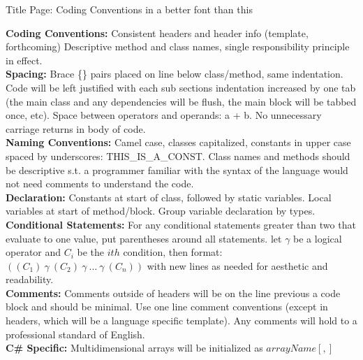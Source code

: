 \documentclass[12pt]{article}
\begin{document}
\noindent
\thispagestyle{empty}
\LARGE Title Page: Coding Conventions in a better font than this
\pagebreak

\normalsize
\textbf{Coding Conventions:}
Consistent headers and header info (template, forthcoming)
Descriptive method and class names, single responsibility principle in effect.\\

\textbf{Spacing:}
Brace \{\} pairs placed on line below class/method, same indentation. Code will be left justified with each sub sections indentation increased by one tab (the main class and any dependencies will be flush, the main block will be tabbed once, etc). Space between operators and operands: a + b. No unnecessary carriage returns in body of code.\\

\textbf{Naming Conventions:}
Camel case, classes capitalized, constants in upper case spaced by underscores: THIS\_IS\_A\_CONST. Class names and methods should be descriptive s.t. a programmer familiar with the syntax of the language would not need comments to understand the code.\\

\textbf{Declaration:}
Constants at start of class, followed by static variables. Local variables at start of method/block. Group variable declaration by types.\\

\textbf{Conditional Statements:} For any conditional statements greater than two that evaluate to one value, put parentheses around all statements. let $\gamma$ be a logical operator and $C_i$ be the $ith$ condition, then format: $((C_1)\ \gamma \ (C_2)\ \gamma\ ...\ \gamma\ (C_n))$ with new lines as needed for aesthetic and readability.\\

\textbf{Comments:} Comments outside of headers will be on the line previous a code block and should be minimal. Use one line comment conventions (except in headers, which will be a language specific template). Any comments will hold to a professional standard of English.\\

\textbf{C\# Specific:} Multidimensional arrays will be initialized as $arrayName [,]$\\

\end{document}
